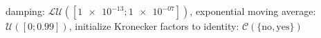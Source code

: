 damping: $\mathcal{LU}([\num[scientific-notation=true]{1e-13}; \num[scientific-notation=true]{1e-07}])$, exponential moving average: $\mathcal{U}([0; \num[scientific-notation=true]{0.99}])$, initialize Kronecker factors to identity: $\mathcal{C}(\{\text{no},\text{yes}\})$